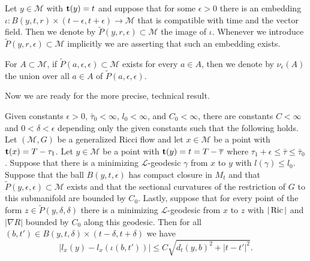 \begin{definition}\label{def:l-parabolic-neighborhood}

Let $y\in {\mathcal M}$ with ${\bf t}(y)=t$ and suppose that for
some $\epsilon>0$ there is an embedding $\iota\colon B(y,t,r)\times
(t-\epsilon,t+\epsilon)\to {\mathcal M}$ that is compatible with
time and the vector field. Then we denote by $\widetilde
P(y,r,\epsilon)\subset {\mathcal M}$ the image of $\iota$. Whenever
we introduce $\widetilde P(y,r,\epsilon)\subset {\mathcal M}$
implicitly we are asserting that such an embedding exists.

For  $A\subset {\mathcal M}$, if $\widetilde
P(a,\epsilon,\epsilon)\subset {\mathcal M}$ exists for every $a\in
A$, then we denote by $\nu_\epsilon(A)$ the union over all $a\in A$
of $\widetilde P(a,\epsilon,\epsilon)$.
\end{definition}


Now we are ready for the more precise, technical result.


\begin{proposition}\label{prop:reduced-length-lipschitz-precise}
\label{lipaty}

Given constants  $\epsilon>0$, $\bar\tau_0<\infty$, $l_0<\infty$,
and $C_0<\infty$, there are constants $ C<\infty$ and
$0<\delta<\epsilon$ depending only the  given constants  such that
the following holds. Let $({\mathcal M},G)$ be a generalized Ricci
flow and let $x\in{\mathcal M}$ be a point with ${\bf
t}(x)=T-\tau_1$. Let $y\in {\mathcal M}$ be a point with ${\bf
t}(y)=t=T-\bar\tau$ where $\tau_1+\epsilon\le \bar\tau\le
\bar\tau_0$. Suppose that there is a minimizing ${\mathcal
L}$-geodesic $\gamma$ from $x$ to $y$ with $l(\gamma)\le l_0$.
Suppose that the ball $B(y,t,\epsilon)$ has compact closure in
$M_{t}$ and that $\widetilde P(y,\epsilon,\epsilon)\subset {\mathcal
M}$ exists and that the sectional curvatures of the restriction of
$G$ to this submanifold are bounded by $C_0$. Lastly, suppose that
for every point of the form $z\in \widetilde P(y,\delta,\delta)$
there is a minimizing ${\mathcal L}$-geodesic from $x$ to $z$ with
$|\Ric|$ and $|\nabla R|$ bounded by $C_0$ along this geodesic.
Then for all $(b,t')\in B(y,t,\delta)\times(t-\delta,t+\delta)$ we
have
$$|l_x(y)-l_x(\iota(b,t'))|\le C\sqrt{d_{t}(y,b)^2+|t-t'|^2}.$$
\end{proposition}




